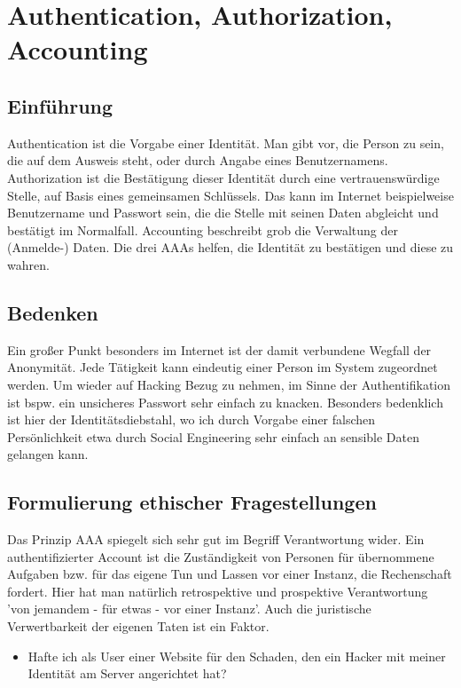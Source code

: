 \documentclass[letterpaper, 12pt]{article}
\let\tempsection\section
\renewcommand\section[1]{\vspace{-0.3cm}\tempsection{#1}\vspace{-0.3cm}}
\let\tempsubsection\subsection
\renewcommand\subsection[1]{\vspace{0cm}\tempsubsection{#1}\vspace{0cm}}
\begin{document}
\clearpage

\section{Authentication, Authorization, Accounting}

\subsection{Einführung}

Authentication ist die Vorgabe einer Identität. Man gibt vor, die Person zu sein, die auf dem Ausweis steht, oder durch Angabe eines Benutzernamens. Authorization ist die Bestätigung dieser Identität durch eine vertrauenswürdige Stelle, auf Basis eines gemeinsamen Schlüssels. Das kann im Internet beispielweise Benutzername und Passwort sein, die die Stelle mit seinen Daten abgleicht und bestätigt im Normalfall. Accounting beschreibt grob die Verwaltung der (Anmelde-) Daten. Die drei AAAs helfen, die Identität zu bestätigen und diese zu wahren. \cite{auth}

\subsection{Bedenken}

Ein großer Punkt besonders im Internet ist der damit verbundene Wegfall der Anonymität. Jede Tätigkeit kann eindeutig einer Person im System zugeordnet werden. Um wieder auf Hacking Bezug zu nehmen, im Sinne der Authentifikation ist bspw. ein unsicheres Passwort sehr einfach zu knacken. Besonders bedenklich ist hier der Identitätsdiebstahl, wo ich durch Vorgabe einer falschen Persönlichkeit etwa durch Social Engineering sehr einfach an sensible Daten gelangen kann. 

\subsection{Formulierung ethischer Fragestellungen}

Das Prinzip AAA spiegelt sich sehr gut im Begriff Verantwortung wider. Ein authentifizierter Account ist die Zuständigkeit von Personen für übernommene Aufgaben bzw. für das eigene Tun und Lassen vor einer Instanz, die Rechenschaft fordert. Hier hat man natürlich retrospektive und prospektive Verantwortung 'von jemandem - für etwas - vor einer Instanz'. Auch die juristische Verwertbarkeit der eigenen Taten ist ein Faktor.

\begin{itemize}
	\item Hafte ich als User einer Website für den Schaden, den ein Hacker mit meiner Identität am Server angerichtet hat?
\end{itemize}
\end{document}
